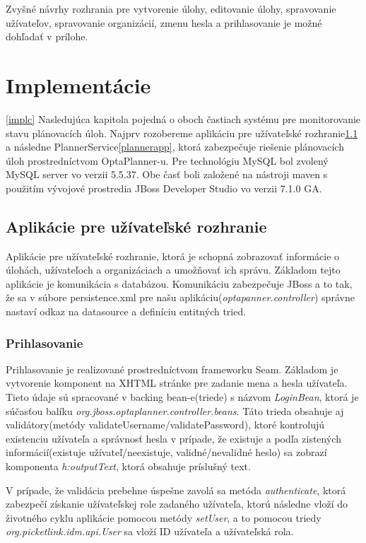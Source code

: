 Zvyšné návrhy rozhrania pre vytvorenie úlohy, editovanie úlohy, spravovanie užívateľov, spravovanie organizácií, zmenu hesla a prihlasovanie je možné dohľadať v prílohe.


\chapter{Implementácie}\ref{implc}
Nasledujúca kapitola pojedná o oboch častiach systému pre monitorovanie stavu plánovacích úloh.  Najprv rozobereme aplikáciu pre užívateľské rozhranie\ref{approz} a následne PlannerService\ref{plannerapp}, ktorá zabezpečuje riešenie plánovacích úloh prostredníctvom OptaPlanner-u. Pre technológiu MySQL bol zvolený MySQL server vo verzii 5.5.37. Obe časť boli založené na nástroji maven\cite{mavenbook} s použitím vývojové prostredia JBoss Developer Studio vo verzii 7.1.0 GA. 


\section{Aplikácie pre užívateľské rozhranie}\label{approz}
Aplikácie pre užívateľské rozhranie, ktorá je schopná zobrazovať informácie o úlohách, užívateľoch a organizáciach a umožňovať ich správu. Základom tejto aplikácie je komunikácia s databázou. Komunikáciu zabezpečuje JBoss a to tak, že sa v súbore persistence.xml pre našu aplikáciu(\emph{optapanner.controller}) správne nastaví odkaz na datasource a definíciu entitných tried.
	

\subsection{Prihlasovanie}
Prihlasovanie je realizované prostredníctvom frameworku Seam. Základom je vytvorenie komponent na XHTML stránke pre zadanie mena a hesla užívateľa. Tieto údaje sú spracované v backing bean-e(triede) s názvom \emph{LoginBean}, ktorá je súčasťou balíku \emph{org.jboss.optaplanner.controller.beans}. Táto trieda obsahuje aj validátory(metódy validateUsername/validatePassword), ktoré kontrolujú existenciu užívateľa a správnosť hesla v prípade, že existuje a podľa zistených informácií(existuje užívateľ/neexistuje, validné/nevalidné heslo) sa zobrazí komponenta \emph{h:outputText}, ktorá obsahuje príslušný text.

V prípade, že validácia prebehne úspešne zavolá sa metóda \emph{authenticate}, ktorá zabezpečí získanie užívateľskej role zadaného užívateľa, ktorú následne vloží do životného cyklu aplikácie pomocou metódy \emph{setUser}, a to pomocou triedy \emph{org.picketlink.idm.api.User} sa vloží ID užívateľa a užívateľská rola.

